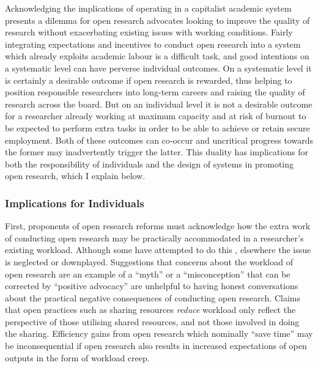 \documentclass[ authordate, meta, issue]{jote-new-article}
\begin{document}
Acknowledging the implications of operating in a capitalist academic system presents a dilemma for open research advocates looking to improve the quality of research without exacerbating existing issues with working conditions. Fairly integrating expectations and incentives to conduct open research into a system which already exploits academic labour is a difficult task, and good intentions on a systematic level can have perverse individual outcomes. On a systematic level it is certainly a desirable outcome if open research is rewarded, thus helping to position responsible researchers into long-term careers and raising the quality of research across the board. But on an individual level it is not a desirable outcome for a researcher already working at maximum capacity and at risk of burnout to be expected to perform extra tasks in order to be able to achieve or retain secure employment. Both of these outcomes can co-occur and uncritical progress towards the former may inadvertently trigger the latter. This duality has implications for both the responsibility of individuals and the design of systems in promoting open research, which I explain below.



\subsubsection{Implications for Individuals}



First, proponents of open research reforms must acknowledge how the extra work of conducting open research may be practically accommodated in a researcher’s existing workload. Although some have attempted to do this \parencites[e.g.][]{Robson2021}, elsewhere the issue is neglected or downplayed. Suggestions that concerns about the workload of open research are an example of a “myth” \parencites{Bastiaansen2019} or a “misconception” that can be corrected by “positive advocacy” \parencites{Hagger2022} are unhelpful to having honest conversations about the practical negative consequences of conducting open research. Claims that open practices such as sharing resources \emph{reduce} workload \parencites{Grahe2020} only reflect the perspective of those utilising shared resources, and not those involved in doing the sharing. Efficiency gains from open research which nominally “save time” \parencites{Lowndes2017} may be inconsequential if open research also results in increased expectations of open outputs in the form of workload creep.
\end{document}

